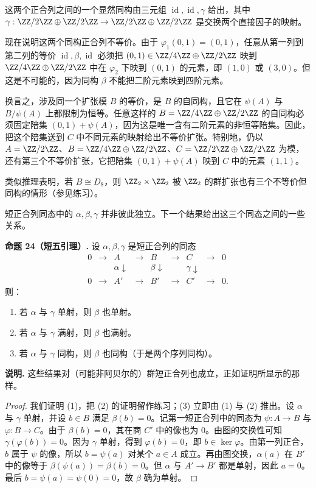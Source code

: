 \begin{enumerate}[label=(\arabic*)]
这两个正合列之间的一个显然同构由三元组 $\operatorname{id},\operatorname{id},\gamma$ 给出，其中 $\gamma:\ZZ/2\ZZ\oplus\ZZ/2\ZZ\to\ZZ/2\ZZ\oplus\ZZ/2\ZZ$ 是交换两个直接因子的映射。

现在说明这两个同构正合列不等价。由于 $\varphi_1(0,1)=(0,1)$，任意从第一列到第二列的等价 $\operatorname{id},\beta,\operatorname{id}$ 必须把 $(0,1)\in \ZZ/4\ZZ\oplus\ZZ/2\ZZ$ 映到 $\ZZ/4\ZZ\oplus\ZZ/2\ZZ$ 中在 $\varphi_2$ 下映到 $(0,1)$ 的元素，即 $(1,0)$ 或 $(3,0)$。但这是不可能的，因为同构 $\beta$ 不能把二阶元素映到四阶元素。

换言之，涉及同一个扩张模 $B$ 的等价，是 $B$ 的自同构，且它在 $\psi(A)$ 与 $B/\psi(A)$ 上都限制为恒等。任意这样的 $B=\ZZ/4\ZZ\oplus\ZZ/2\ZZ$ 的自同构必须固定陪集 $(0,1)+\psi(A)$，因为这是唯一含有二阶元素的非恒等陪集。因此，把这个陪集送到 $C$ 中不同元素的映射给出不等价扩张。特别地，仍以 $A=\ZZ/2\ZZ$、$B=\ZZ/4\ZZ\oplus\ZZ/2\ZZ$、$C=\ZZ/2\ZZ\oplus\ZZ/2\ZZ$ 为模，还有第三个不等价扩张，它把陪集 $(0,1)+\psi(A)$ 映到 $C$ 中的元素 $(1,1)$。

类似推理表明，若 $B\cong D_8$，则 $\ZZ_2\times\ZZ_2$ 被 $\ZZ_2$ 的群扩张也有三个不等价但同构的情形（参见练习）。
\end{enumerate}

短正合列同态中的 $\alpha,\beta,\gamma$ 并非彼此独立。下一个结果给出这三个同态之间的一些关系。

\noindent\textbf{命题 24（短五引理）.} 设 $\alpha,\beta,\gamma$ 是短正合列的同态
\[
\begin{array}{ccccccccc}
0&\longrightarrow&A&\longrightarrow&B&\longrightarrow&C&\longrightarrow&0\\
 &&\alpha\downarrow&&\beta\downarrow&&\gamma\downarrow&&\\
0&\longrightarrow&A'&\longrightarrow&B'&\longrightarrow&C'&\longrightarrow&0.
\end{array}
\]
则：
\begin{enumerate}[label=(\arabic*)]
\item 若 $\alpha$ 与 $\gamma$ 单射，则 $\beta$ 也单射。
\item 若 $\alpha$ 与 $\gamma$ 满射，则 $\beta$ 也满射。
\item 若 $\alpha$ 与 $\gamma$ 同构，则 $\beta$ 也同构（于是两个序列同构）。
\end{enumerate}

\noindent\textbf{说明.} 这些结果对（可能非阿贝尔的）群短正合列也成立，正如证明所显示的那样。

\begin{proof}
我们证明 (1)，把 (2) 的证明留作练习；(3) 立即由 (1) 与 (2) 推出。设 $\alpha$ 与 $\gamma$ 单射，并设 $b\in B$ 满足 $\beta(b)=0$。记第一短正合列中的同态为 $\psi:A\to B$ 与 $\varphi:B\to C$。由于 $\beta(b)=0$，其在商 $C'$ 中的像也为 $0$。由图的交换性可知 $\gamma(\varphi(b))=0$。因为 $\gamma$ 单射，得到 $\varphi(b)=0$，即 $b\in\ker\varphi$。由第一列正合，$b$ 属于 $\psi$ 的像，所以 $b=\psi(a)$ 对某个 $a\in A$ 成立。再由图交换，$\alpha(a)$ 在 $B'$ 中的像等于 $\beta(\psi(a))=\beta(b)=0$。但 $\alpha$ 与 $A'\to B'$ 都是单射，因此 $a=0$。最后 $b=\psi(a)=\psi(0)=0$，故 $\beta$ 确为单射。
\end{proof}


